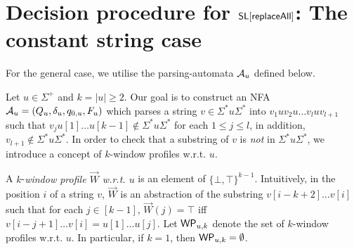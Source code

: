 
\section{Decision procedure for $\mathsf{SL}[\mathsf{replaceAll}]$: The constant string case}

For the general case, we utilise the parsing-automata $\mathcal{A}_u$ defined below.

Let $u \in \Sigma^+$ and $k=|u| \ge 2$.
Our goal is to construct an NFA $\mathcal{A}_u=(Q_u, \delta_u, q_{0,u}, F_u)$ which parses a string $v \in \Sigma^\ast u \Sigma^\ast$ into $v_1 u v_2 u \dots v_l u v_{l+1}$ such that $v_j u[1] \dots u[k-1] \not \in \Sigma^\ast u \Sigma^\ast$ for each $1 \le j \le l$, in addition, $v_{l+1} \not \in \Sigma^\ast u \Sigma^\ast$. 
In order to check that a substring of $v$ is \emph{not} in $\Sigma^\ast u \Sigma^\ast$, we introduce a concept of $k$-window profiles w.r.t. $u$.





A $k$-\emph{window profile $\vec{W}$ w.r.t. $u$} is an element of $\{\bot,\top\}^{k-1}$. Intuitively, in the position $i$ of a string $v$, $\vec{W}$ is an abstraction of the substring $v[i-k+2] \dots v[i]$ such that for each $j \in [k-1]$, $\vec{W}(j) = \top$ iff $v[i-j+1] \dots v[i] = u[1] \dots u[j]$. Let $\mathsf{WP}_{u, k}$ denote the set of $k$-window profiles w.r.t. $u$. In particular, if $k = 1$, then $\mathsf{WP}_{u, k} = \emptyset$. 


